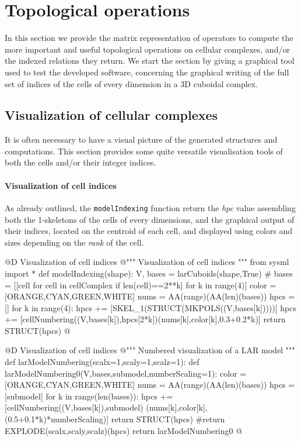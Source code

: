 \documentclass[11pt,oneside]{article}	%
\begin{document}
\section{Topological operations}

In this section we provide the matrix representation of operators to compute the more important and useful topological operations on cellular complexes, and/or the indexed relations they return. We start the section by giving a graphical tool used to test the developed software, concerning the graphical writing of the full set of indices of the cells of every dimension in a 3D cuboidal complex.  

\subsection{Visualization of cellular complexes}

It is often necessary to have a visual picture of the generated structures and computations.
This section provides some quite versatile visualisation tools of both the cells and/or their integer indices.

\paragraph{Visualization of cell indices}
As already outlined, the \texttt{modelIndexing} function return the \emph{hpc} value assembling both the 1-skeletons of the cells of every dimensions, and the graphical output of their indices, located on the centroid of each cell, and displayed using colors and sizes depending on the \emph{rank} of the cell.

@D Visualization of cell indices
@{""" Visualization of cell indices """
from sysml import *
def modelIndexing(shape):
	V, bases = larCuboids(shape,True)
	# bases = [[cell for cell in cellComplex if len(cell)==2**k] for k in range(4)]
	color = [ORANGE,CYAN,GREEN,WHITE]
	nums = AA(range)(AA(len)(bases))
	hpcs = []
	for k in range(4):
		hpcs += [SKEL_1(STRUCT(MKPOLS((V,bases[k]))))]
		hpcs += [cellNumbering((V,bases[k]),hpcs[2*k])(nums[k],color[k],0.3+0.2*k)]
	return STRUCT(hpcs)
@}


@D Visualization of cell indices
@{""" Numbered visualization of a LAR model """
def larModelNumbering(scalx=1,scaly=1,scalz=1):
	def  larModelNumbering0(V,bases,submodel,numberScaling=1):
		color = [ORANGE,CYAN,GREEN,WHITE]
		nums = AA(range)(AA(len)(bases))
		hpcs = [submodel]
		for k in range(len(bases)):
			hpcs += [cellNumbering((V,bases[k]),submodel)
						(nums[k],color[k],(0.5+0.1*k)*numberScaling)]
		return STRUCT(hpcs)
		#return EXPLODE(scalx,scaly,scalz)(hpcs)
	return larModelNumbering0
@}
\end{document}
